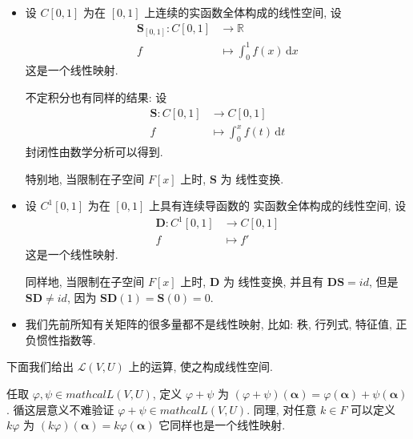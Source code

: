 \documentclass[UTF8]{book}
\begin{document}
\begin{example}
    \begin{itemize}
        \item 设 $C[0,1]$ 为在 $[0,1]$ 上连续的实函数全体构成的线性空间, 
        设 
        $$\begin{aligned}
            \boldsymbol{S}_{[0,1]}: C[0,1] &\to \mathbb{R} \\
                f &\mapsto \int_{0}^{1} f(x)\,\mathrm{d}x
        \end{aligned}
        $$
        这是一个线性映射. 
        
        不定积分也有同样的结果: 
        设 
        $$\begin{aligned}
            \boldsymbol{S}: C[0,1] &\to C[0,1] \\
                f &\mapsto \int_{0}^{x} f(t)\,\mathrm{d}t
        \end{aligned}
        $$
        封闭性由数学分析可以得到. 

        特别地, 当限制在子空间 $F[x]$ 上时, $\boldsymbol{S}$ 为
        线性变换. 

        \item 设 $C^1[0,1]$ 为在 $[0,1]$ 上具有连续导函数的
        实函数全体构成的线性空间, 设 
        $$\begin{aligned}
            \boldsymbol{D}: C^1[0,1] &\to C[0,1] \\
                f &\mapsto f'
        \end{aligned}
        $$
        这是一个线性映射. 

        同样地, 当限制在子空间 $F[x]$ 上时, $\boldsymbol{D}$ 为
        线性变换, 并且有 $\boldsymbol{DS}=id$, 但是 
        $\boldsymbol{SD}\neq id$, 因为 
        $\boldsymbol{SD}(1) = \boldsymbol{S}(0) = 0$. 

        \item 我们先前所知有关矩阵的很多量都不是线性映射, 
        比如: 秩, 行列式, 特征值, 正负惯性指数等. 
    \end{itemize}
\end{example}

下面我们给出 $\mathcal{L}(V,U)$ 上的运算, 使之构成线性空间. 

任取 $\varphi,\psi \in mathcal{L}(V,U)$, 定义 
$\varphi + \psi$ 为 
$(\varphi + \psi)(\boldsymbol{\alpha}) = 
\varphi(\boldsymbol{\alpha})+\psi(\boldsymbol{\alpha})$. 
循这层意义不难验证 $\varphi + \psi \in mathcal{L}(V,U)$. 
同理, 对任意 $k\in F$ 可以定义 $k\varphi$ 为 
$(k\varphi)(\boldsymbol{\alpha}) = k\varphi(\boldsymbol{\alpha})$ 
它同样也是一个线性映射. 
\end{document}
